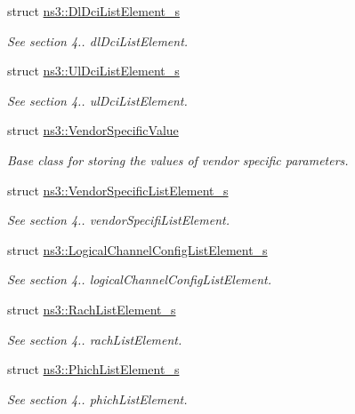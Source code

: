 \begin{DoxyCompactItemize}
\item 
struct \hyperlink{structns3_1_1DlDciListElement__s}{ns3\+::\+Dl\+Dci\+List\+Element\+\_\+s}
\begin{DoxyCompactList}\small\item\em See section 4.. dl\+Dci\+List\+Element. \end{DoxyCompactList}\item 
struct \hyperlink{structns3_1_1UlDciListElement__s}{ns3\+::\+Ul\+Dci\+List\+Element\+\_\+s}
\begin{DoxyCompactList}\small\item\em See section 4.. ul\+Dci\+List\+Element. \end{DoxyCompactList}\item 
struct \hyperlink{structns3_1_1VendorSpecificValue}{ns3\+::\+Vendor\+Specific\+Value}
\begin{DoxyCompactList}\small\item\em Base class for storing the values of vendor specific parameters. \end{DoxyCompactList}\item 
struct \hyperlink{structns3_1_1VendorSpecificListElement__s}{ns3\+::\+Vendor\+Specific\+List\+Element\+\_\+s}
\begin{DoxyCompactList}\small\item\em See section 4.. vendor\+Specifi\+List\+Element. \end{DoxyCompactList}\item 
struct \hyperlink{structns3_1_1LogicalChannelConfigListElement__s}{ns3\+::\+Logical\+Channel\+Config\+List\+Element\+\_\+s}
\begin{DoxyCompactList}\small\item\em See section 4.. logical\+Channel\+Config\+List\+Element. \end{DoxyCompactList}\item 
struct \hyperlink{structns3_1_1RachListElement__s}{ns3\+::\+Rach\+List\+Element\+\_\+s}
\begin{DoxyCompactList}\small\item\em See section 4.. rach\+List\+Element. \end{DoxyCompactList}\item 
struct \hyperlink{structns3_1_1PhichListElement__s}{ns3\+::\+Phich\+List\+Element\+\_\+s}
\begin{DoxyCompactList}\small\item\em See section 4.. phich\+List\+Element. \end{DoxyCompactList}\item 

\end{DoxyCompactItemize}
